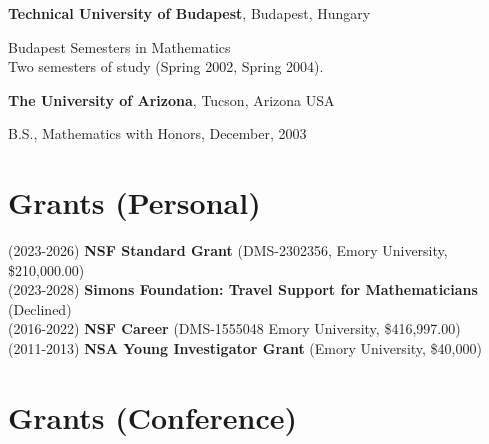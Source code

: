 \documentclass[margin,line]{res}
\newenvironment{list1}{
  \begin{list}{\ding{113}}{%
      \setlength{\itemsep}{0in}
      \setlength{\parsep}{0in} \setlength{\parskip}{0in}
      \setlength{\topsep}{0in} \setlength{\partopsep}{0in}
      \setlength{\leftmargin}{0.17in}}}{\end{list}}
\begin{document}
\begin{resume}
 {\bf Technical University of Budapest}, Budapest, Hungary\\
  \vspace*{-.15in}
  \begin{list1}
  \item[] Budapest Semesters in Mathematics\\
    Two semesters of study (Spring 2002, Spring 2004).
  \end{list1}
\vspace{-7pt}

{\bf The University of Arizona}, Tucson, Arizona USA\\
  \vspace*{-.15in}
  \begin{list1}
  \item[] B.S., Mathematics with Honors, December, 2003\\
  \end{list1}

\vspace{-7pt}
\section{\sc Grants  {(Personal)}}
(2023-2026) \textbf{NSF Standard Grant} (DMS-2302356, Emory University, \$210,000.00) \\
(2023-2028) \textbf{Simons Foundation: Travel Support for Mathematicians} (Declined) \\
(2016-2022) \textbf{NSF Career} (DMS-1555048 Emory University, \$416,997.00) \\
(2011-2013) \textbf{NSA Young Investigator Grant} (Emory University, \$40,000)\\

\vspace{-7pt}
\section{\sc Grants {(Conference)}}


\end{resume}
\end{document}
